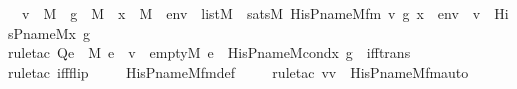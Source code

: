 \begin{isabellebody}
\ \ {\isachardoublequoteopen}v\ {\isasymin}\ M\ {\isasymLongrightarrow}\ g\ {\isasymin}\ M\ {\isasymLongrightarrow}\ x{\isacharprime}{\kern0pt}\ {\isasymin}\ M\ {\isasymLongrightarrow}\ env\ {\isasymin}\ list{\isacharparenleft}{\kern0pt}M{\isacharparenright}{\kern0pt}\ {\isasymLongrightarrow}\ sats{\isacharparenleft}{\kern0pt}M{\isacharcomma}{\kern0pt}\ His{\isacharunderscore}{\kern0pt}P{\isacharunderscore}{\kern0pt}name{\isacharunderscore}{\kern0pt}M{\isacharunderscore}{\kern0pt}fm{\isacharcomma}{\kern0pt}\ {\isacharbrackleft}{\kern0pt}v{\isacharcomma}{\kern0pt}\ g{\isacharcomma}{\kern0pt}\ x{\isacharprime}{\kern0pt}{\isacharbrackright}{\kern0pt}\ {\isacharat}{\kern0pt}\ env{\isacharparenright}{\kern0pt}\ {\isasymlongleftrightarrow}\ v\ {\isacharequal}{\kern0pt}\ His{\isacharunderscore}{\kern0pt}P{\isacharunderscore}{\kern0pt}name{\isacharunderscore}{\kern0pt}M{\isacharparenleft}{\kern0pt}x{\isacharprime}{\kern0pt}{\isacharcomma}{\kern0pt}\ g{\isacharparenright}{\kern0pt}{\isachardoublequoteclose}\ \isanewline
%
\isadelimproof
\isanewline
\ \ %
\endisadelimproof
%
\isatagproof
{}\isamarkupfalse%
{\isacharparenleft}{\kern0pt}rule{\isacharunderscore}{\kern0pt}tac\ Q{\isacharequal}{\kern0pt}{\isachardoublequoteopen}{\isasymforall}e\ {\isasymin}\ M{\isachardot}{\kern0pt}\ e\ {\isasymin}\ v\ {\isasymlongleftrightarrow}\ {\isacharparenleft}{\kern0pt}empty{\isacharparenleft}{\kern0pt}{\isacharhash}{\kern0pt}{\isacharhash}{\kern0pt}M{\isacharcomma}{\kern0pt}\ e{\isacharparenright}{\kern0pt}\ {\isasymand}\ His{\isacharunderscore}{\kern0pt}P{\isacharunderscore}{\kern0pt}name{\isacharunderscore}{\kern0pt}M{\isacharunderscore}{\kern0pt}cond{\isacharparenleft}{\kern0pt}x{\isacharprime}{\kern0pt}{\isacharcomma}{\kern0pt}\ g{\isacharparenright}{\kern0pt}{\isacharparenright}{\kern0pt}{\isachardoublequoteclose}\ \ iff{\isacharunderscore}{\kern0pt}trans{\isacharparenright}{\kern0pt}\isanewline
\ \ \ \isamarkupfalse%
{\isacharparenleft}{\kern0pt}rule{\isacharunderscore}{\kern0pt}tac\ iff{\isacharunderscore}{\kern0pt}flip{\isacharparenright}{\kern0pt}\ \isanewline
\ \ \isamarkupfalse%
\ His{\isacharunderscore}{\kern0pt}P{\isacharunderscore}{\kern0pt}name{\isacharunderscore}{\kern0pt}M{\isacharunderscore}{\kern0pt}fm{\isacharunderscore}{\kern0pt}def\ \isanewline
\ \ \ \isamarkupfalse%
{\isacharparenleft}{\kern0pt}rule{\isacharunderscore}{\kern0pt}tac\ v{\isacharequal}{\kern0pt}v\ \ His{\isacharunderscore}{\kern0pt}P{\isacharunderscore}{\kern0pt}name{\isacharunderscore}{\kern0pt}M{\isacharunderscore}{\kern0pt}fm{\isacharunderscore}{\kern0pt}auto{\isacharparenright}{\kern0pt}\ \isanewline

\end{isabellebody}
